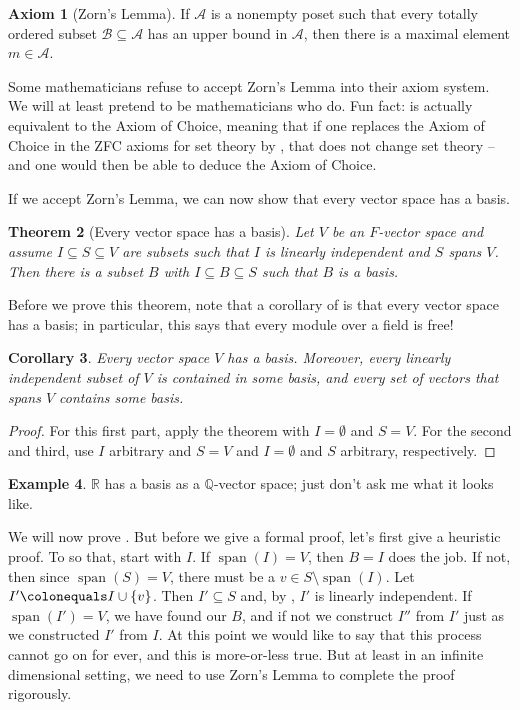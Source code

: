 \documentclass[12pt]{report}
\newtheorem{theorem}{Theorem}[chapter]
\newtheorem{corollary}[theorem]{Corollary}
\numberwithin{equation}{section}
\numberwithin{theorem}{chapter}
\theoremstyle{definition}
\newtheorem{example}[theorem]{Example}
\newtheorem*{basic properties}{Basic Properties}
\newtheorem*{Important Remark}{Important Remark}
\newtheorem{axiom}[theorem]{Axiom}
\newcommand{\R}{\mathbb{R}}
\newcommand{\Q}{\mathbb{Q}}
\DeclareMathOperator{\Span}{span}
\begin{document}
\begin{axiom}[Zorn's Lemma]\label{Zorn}
If $\mathcal{A}$ is a nonempty poset such that every totally ordered subset $\mathcal{B} \subseteq \mathcal{A}$ has an upper bound in $\mathcal{A}$, then there is a maximal element $m \in \mathcal{A}$.
\end{axiom}


Some mathematicians refuse to accept Zorn's Lemma into their axiom system. We will at least pretend to be mathematicians who do. Fun fact:  is actually equivalent to the Axiom of Choice, meaning that if one replaces the Axiom of Choice in the ZFC axioms for set theory by , that does not change set theory -- and one would then be able to deduce the Axiom of Choice.

If we accept Zorn's Lemma, we can now show that every vector space has a basis.

\begin{theorem}[Every vector space has a basis]\label{basisexist}
 Let $V$ be an $F$-vector space and assume $I \subseteq S \subseteq V$ are subsets such that $I$ is linearly independent and $S$ spans $V$. Then there is a subset $B$ with $I \subseteq B \subseteq S$ such that $B$ is a basis.
\end{theorem}

Before we prove this theorem, note that a corollary of  is that every vector space has a basis; in particular, this says that every module over a field is free!

\begin{corollary}\label{every vector space has a basis}
Every vector space $V$ has a basis. Moreover, every linearly independent subset of $V$ is contained in some basis, and every set of vectors that spans $V$ contains some basis.  
\end{corollary}

\begin{proof} 
For this first part, apply the theorem with $I = \emptyset$ and $S = V$. For the second and third, use $I$ arbitrary and $S = V$ and $I = \emptyset$ and $S$ arbitrary, respectively. 
\end{proof}



\begin{example}
$\R$ has a basis as a $\Q$-vector space; just don't ask me what it looks like.
\end{example}


We will now prove .
But before we give a formal proof, let's first give a heuristic proof. To so that, start with $I$. If $\Span(I) = V$, then $B = I$ does the job. If not, then since $\Span(S)=V$, there must be a $v \in S \setminus \Span(I)$. Let $I' \colonequals I \cup \{v\}$. Then $I' \subseteq S$ and, by , $I'$ is linearly independent. 
If $\Span(I') = V$, we have found our $B$, and if not we construct $I''$ from $I'$ just as we constructed $I'$ from $I$. At this point we would like to say that this process cannot go on for ever, and this is more-or-less true. But at least in an infinite dimensional setting, we need to use Zorn's Lemma to complete the proof rigorously.
\end{document}
